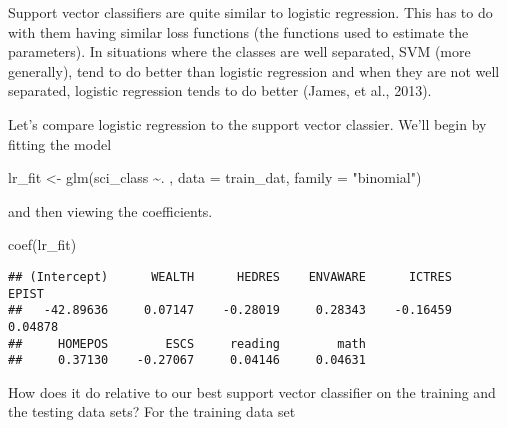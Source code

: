 \documentclass[
]{book}
\newenvironment{Shaded}{\begin{snugshade}}{\end{snugshade}}
\newcommand{\AttributeTok}[1]{\textcolor[rgb]{0.77,0.63,0.00}{#1}}
\newcommand{\FunctionTok}[1]{\textcolor[rgb]{0.00,0.00,0.00}{#1}}
\newcommand{\NormalTok}[1]{#1}
\newcommand{\OtherTok}[1]{\textcolor[rgb]{0.56,0.35,0.01}{#1}}
\newcommand{\SpecialCharTok}[1]{\textcolor[rgb]{0.00,0.00,0.00}{#1}}
\newcommand{\StringTok}[1]{\textcolor[rgb]{0.31,0.60,0.02}{#1}}
\begin{document}
Support vector classifiers are quite similar to logistic regression. This has to do with them having similar loss functions (the functions used to estimate the parameters). In situations where the classes are well separated, SVM (more generally), tend to do better than logistic regression and when they are not well separated, logistic regression tends to do better (James, et al., 2013).

Let's compare logistic regression to the support vector classier. We'll begin by fitting the model

\begin{Shaded}
\begin{Highlighting}[]
\NormalTok{lr\_fit }\OtherTok{\textless{}{-}} \FunctionTok{glm}\NormalTok{(sci\_class }\SpecialCharTok{\textasciitilde{}}\NormalTok{. , }\AttributeTok{data =}\NormalTok{ train\_dat, }\AttributeTok{family =} \StringTok{"binomial"}\NormalTok{)}
\end{Highlighting}
\end{Shaded}

and then viewing the coefficients.

\begin{Shaded}
\begin{Highlighting}[]
\FunctionTok{coef}\NormalTok{(lr\_fit)}
\end{Highlighting}
\end{Shaded}

\begin{verbatim}
## (Intercept)      WEALTH      HEDRES    ENVAWARE      ICTRES       EPIST 
##   -42.89636     0.07147    -0.28019     0.28343    -0.16459     0.04878 
##     HOMEPOS        ESCS     reading        math 
##     0.37130    -0.27067     0.04146     0.04631
\end{verbatim}

How does it do relative to our best support vector classifier on the training and the testing data sets? For the training data set

\begin{Shaded}
\end{Shaded}
\end{document}
